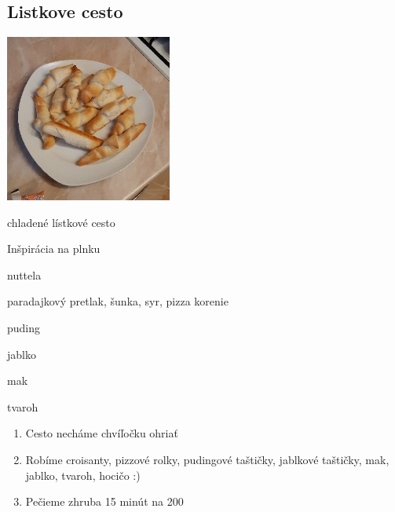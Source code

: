 \setcounter{step}{0}
\subsection{Listkove cesto}

\begin{ingredient}
\includegraphics[height=5.5cm]{images/listkove_cesto}
\def\portions{4}%

\begin{main}
	\item chladené lístkové cesto
\end{main}
\begin{subingredient}{Inšpirácia na plnku}
	\item nuttela
	\item paradajkový pretlak, šunka, syr, pizza korenie
	\item puding
	\item jablko
	\item mak
	\item tvaroh
\end{subingredient}
\end{ingredient}
\begin{recipe}

\begin{enumerate}
\item{Cesto necháme chvíľočku ohriať}
\item{Robíme croisanty, pizzové rolky, pudingové taštičky, jablkové taštičky, mak, jablko, tvaroh, hocičo :)}
\item{Pečieme zhruba 15 minút na 200}
\end{enumerate}
\end{recipe}

\begin{notes}

\end{notes}
\clearpage	